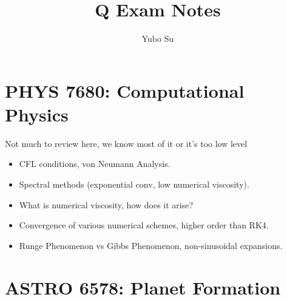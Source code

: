 \documentclass[11pt,
        usenames, %
        dvipsnames %
    ]{article}
\begin{document}
\def\Snospace~{\S{}} %
\renewcommand*{\sectionautorefname}{\Snospace}
\renewcommand*{\appendixautorefname}{\Snospace}
\renewcommand*{\figureautorefname}{Fig.}
\renewcommand*{\equationautorefname}{Eq.}
\renewcommand*{\tableautorefname}{Tab.}

\onehalfspacing

\pagestyle{fancy}
\rhead{}
\cfoot{\thepage/\pageref{LastPage}}

\title{Q Exam Notes}
\author{Yubo Su}

\maketitle

\section{PHYS 7680: Computational Physics}

Not much to review here, we know most of it or it's too low level

\begin{itemize}
    \item CFL conditions, von Neumann Analysis.
    \item Spectral methods (exponential conv, low numerical viscosity).
    \item What is numerical viscosity, how does it arise?
    \item Convergence of various numerical schemes, higher order than RK4.
    \item Runge Phenomenon vs Gibbs Phenomenon, non-sinusoidal expansions.
\end{itemize}

\section{ASTRO 6578: Planet Formation}
\end{document}
